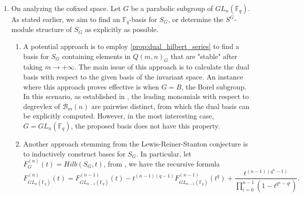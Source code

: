 \documentclass[12pt,a4paper]{report}
\theoremstyle{definition}
\theoremstyle{remark}
\theoremstyle{definition}
\begin{document}
\begin{enumerate}
\begin{enumerate}
        \item The proof of \cref{thm:pol_bivariate} reveals an interesting feature of $A_m^{(n)}$, namely, after suitably "differentiating", we get a $\mathcal{D}_n$-module that does not depend on $m$. The first part in the proof of \cref{thm:pol_bivariate} can be extended to the general case; however, one needs to examine the exact form of the leading monomials (with respect to a monomial order) of the differentiated polynomials. 
        \item The proofs of \cref{cor:weak_version_m_less_than_n} and \cref{prop:weakened_version} follow from a different approach. The missing piece of this approach is the following question. Suppose that for some $f\in A_{m}^{(n-1)}$, $\delta_{n}(f)$ is divisible by $Q_{n,0}$. By \eqref{eq:fundamental_functional_eq}, $g=\dfrac{\delta_n(f)}{Q_{n,0}}\in A_{m}^{(n)}$. How does one express $g$ as a $\mathcal{D}_n$-linear combination of $G_m^{(n)}$?
    \end{enumerate}
    \item On analyzing the cofixed space.\smallbreak
    Let $G$ be a parabolic subgroup of $GL_n(\mathbb{F}_q)$. As stated earlier, we aim to find an $\mathbb{F}_q$-basis for $S_{G}$, or determine the $S^G$-module structure of $S_G$ as explicitly as possible.
    \begin{enumerate}
        \item A potential approach is to employ \cref{prop:dual_hilbert_series} to find a basis for $S_G$ containing elements in $Q(m, n)_G$ that are "stable" after taking $m\to +\infty$. The main issue of this approach is to calculate the dual basis with respect to the given basis of the invariant space. An instance where this approach proves effective is when $G=B$, the Borel subgroup. In this scenario, as established in \cite[Corollary 5.4]{Ha_Hai_Nghia_2024}, the leading monomials with respect to degrevlex of $\mathcal{B}_m(n)$ are pairwise distinct, from which the dual basis can be explicitly computed. However, in the most interesting case, $G = GL_n(\mathbb{F}_q)$, the proposed basis does not have this property.
        \item Another approach stemming from the Lewis-Reiner-Stanton conjecture is to inductively construct bases for $S_G$. In particular, let $F_G^{(n)}(t) = Hilb(S_G, t)$, from \cite[Equation (5.9)]{Lewis_Reiner_Stanton_2017}, we have the recursive formula
        \begin{equation*}
            F_{GL_n(\mathbb{F}_q)}^{(n)}(t) = F_{GL_{n-1}(\mathbb{F}_q)}^{(n-1)}(t) - t^{(n-1)(q-1)}F_{GL_{n-1}(\mathbb{F}_q)}^{(n-1)}(t^q) + \dfrac{t^{(n-1)(q^n-1)}}{\prod\limits_{i=0}^{n-1}(1-t^{q^n-q^i})}.  

\end{equation*}
\end{enumerate}
\end{enumerate}
\end{document}
